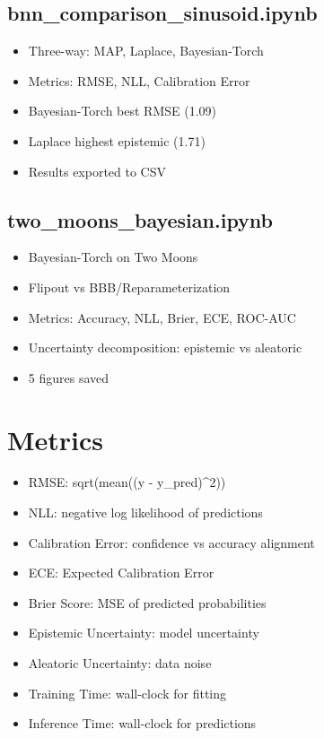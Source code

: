 \documentclass[11pt]{article}
\begin{document}
\subsection{bnn\_comparison\_sinusoid.ipynb}
\begin{itemize}
\item Three-way: MAP, Laplace, Bayesian-Torch
\item Metrics: RMSE, NLL, Calibration Error
\item Bayesian-Torch best RMSE (1.09)
\item Laplace highest epistemic (1.71)
\item Results exported to CSV
\end{itemize}

\subsection{two\_moons\_bayesian.ipynb}
\begin{itemize}
\item Bayesian-Torch on Two Moons
\item Flipout vs BBB/Reparameterization
\item Metrics: Accuracy, NLL, Brier, ECE, ROC-AUC
\item Uncertainty decomposition: epistemic vs aleatoric
\item 5 figures saved
\end{itemize}

\section{Metrics}

\begin{itemize}
\item RMSE: sqrt(mean((y - y\_pred)\textasciicircum2))
\item NLL: negative log likelihood of predictions
\item Calibration Error: confidence vs accuracy alignment
\item ECE: Expected Calibration Error
\item Brier Score: MSE of predicted probabilities
\item Epistemic Uncertainty: model uncertainty
\item Aleatoric Uncertainty: data noise
\item Training Time: wall-clock for fitting
\item Inference Time: wall-clock for predictions
\end{itemize}
\end{document}
